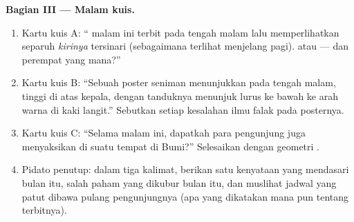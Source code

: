 \begin{problem}
\medskip\noindent\textbf{Bagian III --- Malam kuis.}
\begin{enumerate}[resume]
  \item Kartu kuis A: `` malam ini terbit pada tengah malam lalu
        memperlihatkan separuh \emph{kirinya} tersinari (sebagaimana
        terlihat menjelang pagi).  atau  --- dan
        perempat yang mana?''
  \item Kartu kuis B: ``Sebuah poster seniman menunjukkan  
        pada tengah malam, tinggi di atas kepala, dengan tanduknya
        menunjuk lurus ke bawah ke arah warna  di
        kaki langit.'' Sebutkan setiap kesalahan ilmu falak pada
        posternya.
  \item Kartu kuis C: ``Selama  malam ini, dapatkah para
        pengunjung juga menyaksikan  di suatu tempat
        di Bumi?'' Selesaikan dengan geometri .
  \item Pidato penutup: dalam tiga kalimat, berikan satu kenyataan
        yang mendasari bulan itu, salah paham yang dikubur bulan itu,
        dan muslihat jadwal yang patut dibawa pulang pengunjungnya
        (apa yang dikatakan  mana pun tentang  terbitnya).
\end{enumerate}
\end{problem}
